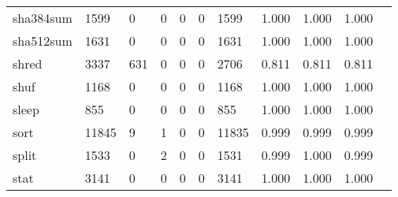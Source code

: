 \begin{longtable}{lp{1.10cm}p{1.10cm}p{1.10cm}p{1.10cm}p{1.10cm}p{1.10cm}p{1.10cm}p{1.10cm}p{1.10cm}p{1.10cm}}
sha384sum &                   1599 &                                  0 &                                 0 &                                0 &                                 0 &                            1599 &                             1.000 &                                 1.000 &                               1.000 \\
sha512sum &                   1631 &                                  0 &                                 0 &                                0 &                                 0 &                            1631 &                             1.000 &                                 1.000 &                               1.000 \\
shred     &                   3337 &                                631 &                                 0 &                                0 &                                 0 &                            2706 &                             0.811 &                                 0.811 &                               0.811 \\
shuf      &                   1168 &                                  0 &                                 0 &                                0 &                                 0 &                            1168 &                             1.000 &                                 1.000 &                               1.000 \\
sleep     &                    855 &                                  0 &                                 0 &                                0 &                                 0 &                             855 &                             1.000 &                                 1.000 &                               1.000 \\
sort      &                  11845 &                                  9 &                                 1 &                                0 &                                 0 &                           11835 &                             0.999 &                                 0.999 &                               0.999 \\
split     &                   1533 &                                  0 &                                 2 &                                0 &                                 0 &                            1531 &                             0.999 &                                 1.000 &                               0.999 \\
stat      &                   3141 &                                  0 &                                 0 &                                0 &                                 0 &                            3141 &                             1.000 &                                 1.000 &                               1.000 \\

\end{longtable}
